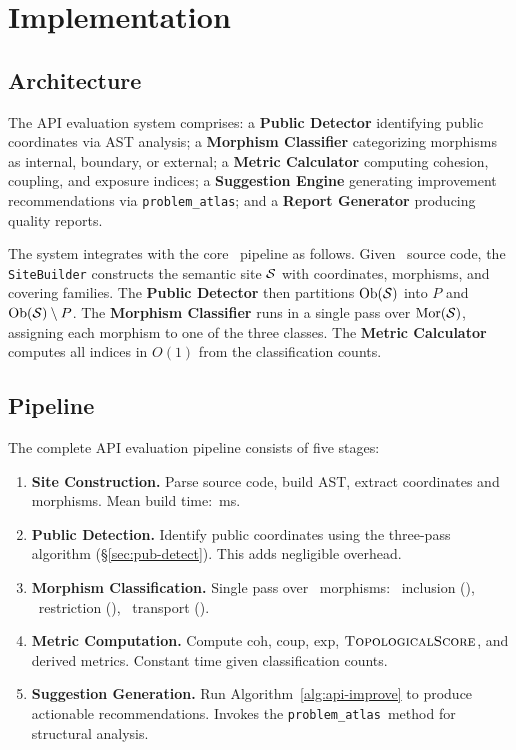 \documentclass[11pt]{article}
\newcommand{\TopoScore}{\textsc{TopologicalScore}}
\newcommand{\CohIndex}{\mathrm{coh}}
\newcommand{\CoupIndex}{\mathrm{coup}}
\newcommand{\ExpIndex}{\mathrm{exp}}
\newcommand{\ProbAtlas}{\texttt{problem\_atlas}}
\begin{document}
\section{Implementation}\label{sec:implementation}

\subsection{Architecture}
The API evaluation system comprises: a \textbf{Public Detector} identifying
public coordinates via AST analysis; a \textbf{Morphism Classifier}
categorizing morphisms as internal, boundary, or external; a \textbf{Metric
Calculator} computing cohesion, coupling, and exposure indices; a
\textbf{Suggestion Engine} generating improvement recommendations via
\ProbAtlas; and a \textbf{Report Generator} producing quality reports.

The system integrates with the core \JuGeo\ pipeline as follows.  Given
\Python\ source code, the \texttt{SiteBuilder} constructs the semantic site
$\mathcal{S}$ with coordinates, morphisms, and covering families.  The
\textbf{Public Detector} then partitions $\mathrm{Ob}(\mathcal{S})$ into $P$ and
$\mathrm{Ob}(\mathcal{S}) \setminus P$.  The \textbf{Morphism Classifier} runs in a
single pass over $\mathrm{Mor}(\mathcal{S})$, assigning each morphism to one of the three
classes.  The \textbf{Metric Calculator} computes all indices in $O(1)$
from the classification counts.

\subsection{Pipeline}

The complete API evaluation pipeline consists of five stages:

\begin{enumerate}[noitemsep]
  \item \textbf{Site Construction.}  Parse source code, build AST,
        extract coordinates and morphisms.  Mean build time:
        \compSiteMeanBuildMs\,ms.
  \item \textbf{Public Detection.}  Identify public coordinates using
        the three-pass algorithm (§\ref{sec:pub-detect}).  This adds
        negligible overhead.
  \item \textbf{Morphism Classification.}  Single pass over
        \compMorphTotal\ morphisms: \compMorphInclusion\ inclusion
        (\compMorphInclusionPct), \compMorphRestriction\ restriction
        (\compMorphRestrictionPct), \compMorphTransport\ transport
        (\compMorphTransportPct).
  \item \textbf{Metric Computation.}  Compute $\CohIndex$, $\CoupIndex$,
        $\ExpIndex$, $\TopoScore$, and derived metrics.  Constant time
        given classification counts.
  \item \textbf{Suggestion Generation.}  Run Algorithm~\ref{alg:api-improve}
        to produce actionable recommendations.  Invokes the \ProbAtlas\
        method for structural analysis.
\end{enumerate}
\end{document}
